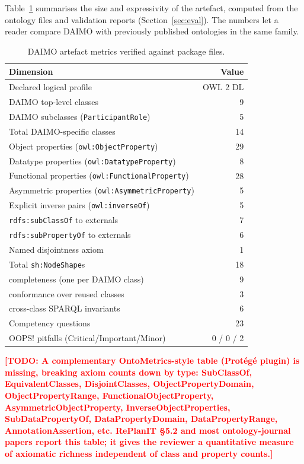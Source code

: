 \documentclass[11pt,a4paper]{article}
\newcommand{\code}[1]{\texttt{#1}}
\newcommand{\TODO}[1]{\textcolor{red}{\textbf{[TODO: #1]}}}
\begin{document}
Table~\ref{tab:metrics} summarises the size and expressivity of the artefact, computed from the ontology files and validation reports (Section~\ref{sec:eval}). The numbers let a reader compare DAIMO with previously published ontologies in the same family.

\begin{table}[t]
\small\sf\centering
\caption{DAIMO artefact metrics verified against package files.\label{tab:metrics}}
\begin{tabular}{@{}p{4.6cm}r@{}}
\toprule
\textbf{Dimension} & \textbf{Value} \\
\midrule
Declared logical profile & OWL 2 DL \\
DAIMO top-level classes & 9 \\
DAIMO subclasses (\code{ParticipantRole}) & 5 \\
Total DAIMO-specific classes & 14 \\
Object properties (\code{owl:ObjectProperty}) & 29 \\
Datatype properties (\code{owl:DatatypeProperty}) & 8 \\
Functional properties (\code{owl:FunctionalProperty}) & 28 \\
Asymmetric properties (\code{owl:AsymmetricProperty}) & 5 \\
Explicit inverse pairs (\code{owl:inverseOf}) & 5 \\
\code{rdfs:subClassOf} to externals & 7 \\
\code{rdfs:subPropertyOf} to externals & 6 \\
Named disjointness axiom & 1 \\
Total \code{sh:NodeShape}s & 18 \\
\quad completeness (one per DAIMO class) & 9 \\
\quad conformance over reused classes & 3 \\
\quad cross-class SPARQL invariants & 6 \\
Competency questions & 23 \\
OOPS! pitfalls (Critical/Important/Minor) & 0 / 0 / 2 \\
\bottomrule
\end{tabular}
\end{table}

\TODO{A complementary OntoMetrics-style table (Prot\'eg\'e plugin) is missing, breaking axiom counts down by type: SubClassOf, EquivalentClasses, DisjointClasses, ObjectPropertyDomain, ObjectPropertyRange, FunctionalObjectProperty, AsymmetricObjectProperty, InverseObjectProperties, SubDataPropertyOf, DataPropertyDomain, DataPropertyRange, AnnotationAssertion, etc. RePlanIT \S5.2 and most ontology-journal papers report this table; it gives the reviewer a quantitative measure of axiomatic richness independent of class and property counts.}
\end{document}

